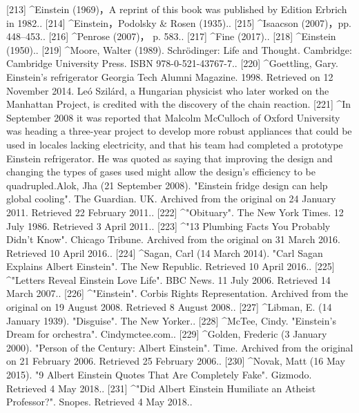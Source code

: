 [213]
^Einstein (1969)，A reprint of this book was published by Edition Erbrich in 1982..
[214]
^Einstein，Podolsky & Rosen (1935)..
[215]
^Isaacson (2007)，pp. 448–453..
[216]
^Penrose (2007)， p. 583..
[217]
^Fine (2017)..
[218]
^Einstein (1950)..
[219]
^Moore, Walter (1989). Schrödinger: Life and Thought. Cambridge: Cambridge University Press. ISBN 978-0-521-43767-7..
[220]
^Goettling, Gary. Einstein's refrigerator Georgia Tech Alumni Magazine. 1998. Retrieved on 12 November 2014. Leó Szilárd, a Hungarian physicist who later worked on the Manhattan Project, is credited with the discovery of the chain reaction.
[221]
^In September 2008 it was reported that Malcolm McCulloch of Oxford University was heading a three-year project to develop more robust appliances that could be used in locales lacking electricity, and that his team had completed a prototype Einstein refrigerator. He was quoted as saying that improving the design and changing the types of gases used might allow the design's efficiency to be quadrupled.Alok, Jha (21 September 2008). "Einstein fridge design can help global cooling". The Guardian. UK. Archived from the original on 24 January 2011. Retrieved 22 February 2011..
[222]
^"Obituary". The New York Times. 12 July 1986. Retrieved 3 April 2011..
[223]
^"13 Plumbing Facts You Probably Didn't Know". Chicago Tribune. Archived from the original on 31 March 2016. Retrieved 10 April 2016..
[224]
^Sagan, Carl (14 March 2014). "Carl Sagan Explains Albert Einstein". The New Republic. Retrieved 10 April 2016..
[225]
^"Letters Reveal Einstein Love Life". BBC News. 11 July 2006. Retrieved 14 March 2007..
[226]
^"Einstein". Corbis Rights Representation. Archived from the original on 19 August 2008. Retrieved 8 August 2008..
[227]
^Libman, E. (14 January 1939). "Disguise". The New Yorker..
[228]
^McTee, Cindy. "Einstein's Dream for orchestra". Cindymctee.com..
[229]
^Golden, Frederic (3 January 2000). "Person of the Century: Albert Einstein". Time. Archived from the original on 21 February 2006. Retrieved 25 February 2006..
[230]
^Novak, Matt (16 May 2015). "9 Albert Einstein Quotes That Are Completely Fake". Gizmodo. Retrieved 4 May 2018..
[231]
^"Did Albert Einstein Humiliate an Atheist Professor?". Snopes. Retrieved 4 May 2018..